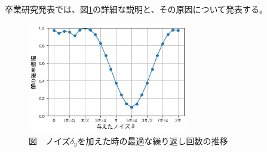 \documentclass[platex,dvipdfmx, twocolumn]{jsarticle}			%
\begin{document}
卒業研究発表では、図\ref{fig:P(k)}の詳細な説明と、その原因について発表する。

\begin{figure}
\centering
\includegraphics[width=70mm]{figures/sample.png}
\caption*{図　ノイズ$\delta_y$を加えた時の最適な繰り返し回数の推移}
\label{fig:P(k)}
\end{figure}



\end{document}
